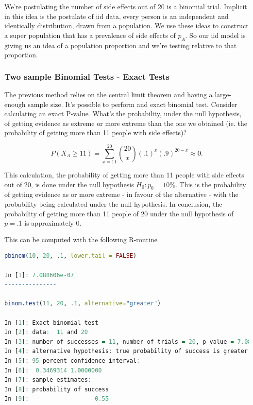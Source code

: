 \documentclass{homework}
\begin{document}
We're postulating the number of side effects out of 20 is a binomial trial. Implicit in this idea is the postulate of iid data, every person is an independent and identically distribution, drawn from a population. We use these ideas to construct a super population that has a prevalence of side effects of $p_A$. So our iid model is giving us an idea of a population proportion and we're testing relative to that proportion. 

\subsubsection{Two sample Binomial Tests - Exact Tests}

The previous method relies on the central limit theorem and having a large-enough sample size. It's possible to perform and exact binomial test. Consider calculating an exact P-value. What's the probability, under the null hypothesis, of getting evidence as extreme or more extreme than the one we obtained (ie. the probability of getting more than 11 people with side effects)?

$$
P(X_A\geq 11) = \sum_{x=11}^{20} {{20}\choose{x}} (.1)^x (.9)^{20-x} \approx 0.
$$

This calculation, the probability of getting more than 11 people with side effects out of 20, is done under the null hypothesis $H_0 : p_0 = 10\%$. This is the probability of getting evidence as or more extreme - in favour of the alternative - with the probability being calculated under the null hypothesis. In conclusion, the probability of getting more than 11 people of 20 under the null hypothesis of $p=.1$ is approximately 0.

This can be computed with the following R-routine 

\begin{lstlisting}[language=R]
pbinom(10, 20, .1, lower.tail = FALSE)

In [1]: 7.088606e-07
---------------

binom.test(11, 20, .1, alternative="greater")

In [1]: Exact binomial test
In [2]: data:  11 and 20
In [3]: number of successes = 11, number of trials = 20, p-value = 7.089e-07
In [4]: alternative hypothesis: true probability of success is greater than 0.1
In [5]: 95 percent confidence interval:
In [6]:  0.3469314 1.0000000
In [7]: sample estimates:
In [8]: probability of success 
In [9]:                   0.55 
\end{lstlisting}
\end{document}
